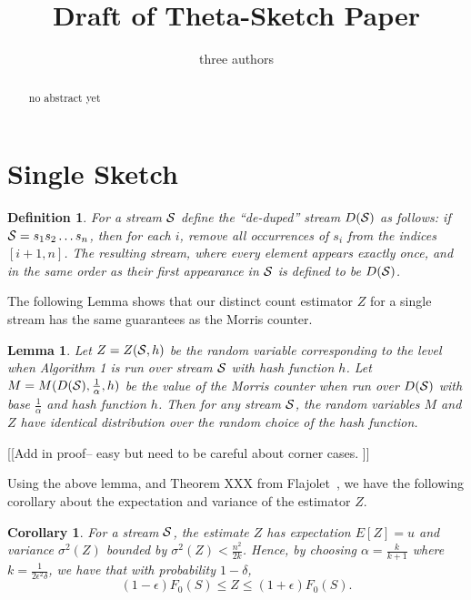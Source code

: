 \documentclass{sig-alternate}
\newtheorem{lemma}[theorem]{Lemma}
\newtheorem{corollary}[theorem]{Corollary}
\newtheorem{definition}[theorem]{Definition}
\begin{document}

\title{Draft of Theta-Sketch Paper}

\author{three authors}

\maketitle
\begin{abstract}
no abstract yet
\end{abstract}
\def\S{{\cal S}}

\section{Single Sketch}
\begin{definition}
For a stream $\S$ define the ``de-duped'' stream $D(\S)$ as follows: if $\S = s_1 s_2\ldots s_n$, then for each $i$, remove all occurrences of $s_i$ from the indices $[i+1, n]$. The resulting stream, where every element appears exactly once, and in the same order as their first appearance in $\S$ is defined to be $D(\S)$.
\end{definition}

The following Lemma shows that our distinct count estimator $Z$ for a single stream has the same guarantees as the Morris counter.
\begin{lemma}
	Let $Z = Z(\S,h)$ be the random variable corresponding to the level when Algorithm 1 is run over stream $\S$ with hash function $h$. Let $M = M(D(\S), \frac{1}{\alpha}, h)$ be the value of the Morris counter when run over $D(\S)$ with base $\frac{1}{\alpha}$ and hash function $h$. Then for any stream $\S$, the random variables $M$ and $Z$ have identical distribution over the random choice of the hash function.  
\end{lemma}

[[Add in proof-- easy but need to be careful about corner cases. ]]

Using the above lemma, and Theorem XXX from Flajolet~\cite{}, we have the following corollary about the expectation and variance of the estimator $Z$. 

\begin{corollary}
For a stream $\S$, the estimate $Z$ has expectation $E[Z] = u$ and variance $\sigma^2(Z)$ bounded by $\sigma^2(Z) < \frac{n^2}{2k}$. Hence, by choosing $\alpha = \frac{k}{k+1}$ where $k = \frac{1}{2\epsilon^2 \delta}$, we have that with probability $ 1 - \delta$, $$ (1 - \epsilon)F_0(S) \le Z \le (1 + \epsilon)F_0(S).$$
\end{corollary}
\end{document}
